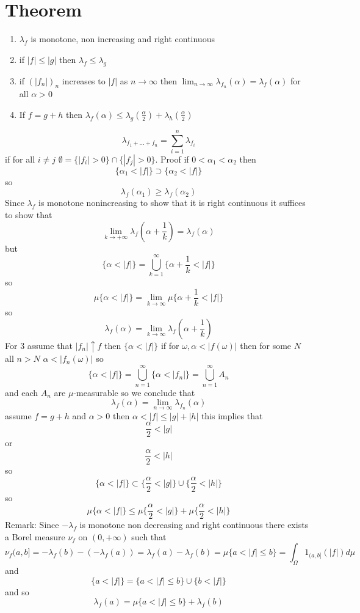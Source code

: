 \documentclass[11pt]{article}
\begin{document}
\section{Theorem}
 \begin{enumerate}
     \item $\lambda_f$ is monotone, non increasing and right continuous
     \item if $|f| \le |g|$ then  $\lambda_f \le \lambda_g$
     \item if $(|f_n|)_n$ increases to  $|f|$ as  $n \to \infty$ then $\lim_{n\to \infty}\lambda_{f_n}(\alpha) = \lambda_f(\alpha)$ for all $\alpha > 0$
     \item If $f = g + h$ then  $\lambda_f(\alpha) \le \lambda_g(\frac{\alpha}{2}) + \lambda_h(\frac{\alpha}{2})$
\end{enumerate}
\[
    \lambda_{f_1 + \dots + f_n} = \sum_{i=1}^{n} \lambda_{f_i}
\] 
if for all $i \ne j$  $\emptyset = \{|f_i| > 0\} \cap \{|f_j| > 0\}$.
Proof if  $0 < \alpha_1 < \alpha_2$ then
\[
    \{\alpha_1 < |f|\} \supset \{\alpha_2 < |f|\}
\] 
so
\[
\lambda_f(\alpha_1) \ge \lambda_f(\alpha_2)
\] 
Since $\lambda_f$ is monotone  nonincreasing to show that it is right continuous it suffices to show
that
\[
\lim_{k\to +\infty} \lambda_f(\alpha + \frac{1}{k}) = \lambda_f(\alpha)
\] 
but
\[
    \{\alpha < |f|\} = \bigcup_{k=1}^{\infty}\{\alpha + \frac{1}{k} < |f|\}
\] 
so
\[
    \mu\{\alpha < |f|\} = \lim_{k\to \infty} \mu\{\alpha + \frac{1}{k} < |f|\}
\] 
so
\[
\lambda_f(\alpha) = \lim_{k\to \infty} \lambda_f(\alpha + \frac{1}{k})
\] 
For 3 assume that $|f_n| \uparrow f$ then  $\{\alpha < |f|\}$ if for $\omega, \alpha < |f(\omega)|$ then for some $N$ all  $n > N$  $\alpha < |f_n(\omega)|$
so
\[
    \{\alpha < |f|\} = \bigcup_{n=1}^\infty \{\alpha < |f_n|\} = \bigcup_{n=1}^{\infty}A_n
\] 
and each $A_n$ are  $\mu$-measurable so we conclude that
\[
    \lambda_f(\alpha) = \lim_{n\to \infty}\lambda_{f_n}(\alpha)
\] 
assume $f = g + h$ and  $\alpha > 0$ then $\alpha < |f| \le |g| + |h|$  this implies that
\[
\frac{\alpha}{2} < |g|
\] 
or 
\[
\frac{\alpha}{2} < |h|
\] 
so
\[
    \{\alpha < |f|\} \subset \{\frac{\alpha}{2} < |g|\} \cup \{\frac{\alpha}{2} < |h|\}
\] 
so
\[
    \mu\{\alpha < |f|\} \le \mu\{\frac{\alpha}{2} < |g|\} + \mu\{\frac{\alpha}{2} < |h|\}
\] 
Remark: Since $-\lambda_f$ is monotone non decreasing and right continuous there exists a Borel measure  $\nu_f$ on  $(0,+\infty)$ such that
\[
    \nu_f(a,b] = -\lambda_f(b) - (- \lambda_f(a)) = \lambda_f(a) - \lambda_f(b) = \mu\{a < |f| \le b\} = \int_{\Omega}^{} 1_{(a,b]}(|f|) d \mu
\] 
and
\[
    \{a < |f|\} = \{a < |f| \le b\} \cup \{b < |f|\}
\] 
and so
\[
    \lambda_f(a) = \mu\{a < |f| \le b\} + \lambda_f(b)
\] 
\end{document}
